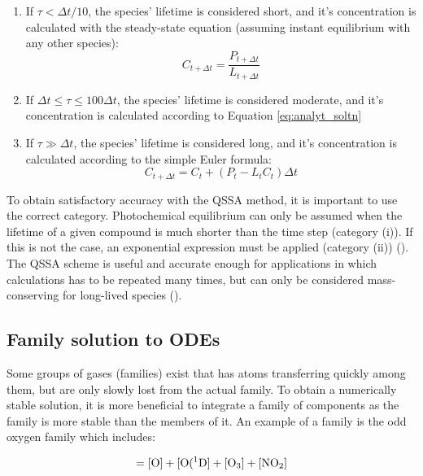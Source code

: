 \begin{enumerate}[label=(\roman*)]
    \item If $\tau < \Delta t/10$, the species' lifetime is considered short, and it's concentration is calculated with the steady-state equation (assuming instant equilibrium with any other species):
    \begin{equation}
        C_{t + \Delta t} = \frac{P_{t + \Delta t}}{L_{t + \Delta t}}
        \label{eq:a}
    \end{equation}
    \item If $\Delta t \leq \tau \leq 100\Delta t$, the species' lifetime is considered moderate, and it's concentration is calculated according to Equation \ref{eq:analyt_soltn}
    \item If $\tau \gg \Delta t$, the species' lifetime is considered long, and it's concentration is calculated according to the simple Euler formula: 
    \begin{equation}
        C_{t + \Delta t} = C_t + (P_t - L_tC_t)\Delta t
        \label{eq:b}
    \end{equation}
\end{enumerate}

To obtain satisfactory accuracy with the QSSA method, it is important to use the correct category. Photochemical equilibrium can only be assumed when the lifetime of a given compound is much shorter than the time step (category (i)). If this is not the case, an exponential expression must be applied (category (ii)) (\cite{Hesstvedt1978}). The QSSA scheme is useful and accurate enough for applications in which calculations has to be repeated many times, but can only  be considered mass-conserving for long-lived species (\cite{AtmModFund}). 

\subsection{Family solution to ODEs}\label{sec:families}

Some groups of gases (families) exist that has atoms transferring quickly among them, but are only slowly lost from the actual family. To obtain a numerically stable solution, it is more beneficial to integrate a family of components as the family is more stable than the members of it. An example of a family is the odd oxygen family which includes: 

\begin{equation*}
    [\chem{O_T}] = [\chem{O}] + [\chem{O(^1D}] + [\chem{O_3}] + [\chem{NO_2}]
\end{equation*}

